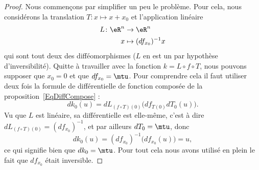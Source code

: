 \begin{proof}
    Nous commençons par simplifier un peu le problème. Pour cela, nous considérons la translation \( T\colon x\mapsto x+x_0 \) et l'application linéaire
    \begin{equation}
        \begin{aligned}
            L\colon \eR^n&\to \eR^n \\
            x&\mapsto (df_{x_0})^{-1}x
        \end{aligned}
    \end{equation}
    qui sont tout deux des difféomorphismes (\( L\) en est un par hypothèse d'inversibilité). Quitte à travailler avec la fonction \( k=L\circ f\circ T\), nous pouvons supposer que \( x_0=0\) et que \( df_{x_0}=\mtu\). Pour comprendre cela il faut utiliser deux fois la formule de différentielle de fonction composée de la proposition~\ref{EqDiffCompose} :
    \begin{equation}
        dk_0(u)=dL_{(f\circ T)(0)}\Big( df_{T(0)}dT_0(u) \Big).
    \end{equation}
    Vu que \( L\) est linéaire, sa différentielle est elle-même, c'est à dire \( dL_{(f\circ T)(0)}=(df_{x_0})^{-1}\), et par ailleurs \( dT_0=\mtu\), donc
    \begin{equation}
        dk_0(u)=(df_{x_0})^{-1}\Big( df_{x_0}(u) \Big)=u,
    \end{equation}
    ce qui signifie bien que \( dk_0=\mtu\). Pour tout cela nous avons utilisé en plein le fait que \( df_{x_0}\) était inversible.


\end{proof}
